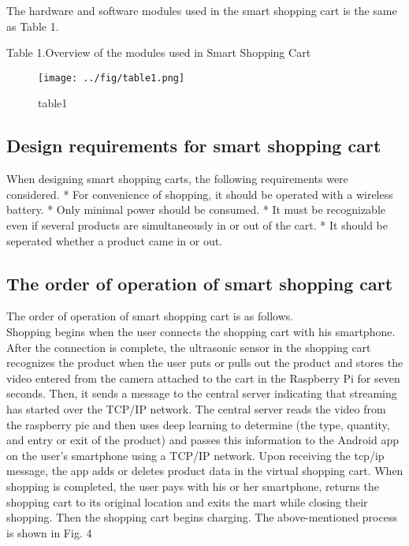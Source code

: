 \documentclass[smallextended]{svjour3}       %
\begin{document}
The hardware and software modules used in the smart shopping cart is the
same as Table 1.

Table 1.Overview of the modules used in Smart Shopping Cart

\begin{figure}
\centering
\texttt{[image: ../fig/table1.png]}
\caption{table1}
\end{figure}

\hypertarget{design-requirements-for-smart-shopping-cart}{%
\subsection{Design requirements for smart shopping
cart}\label{design-requirements-for-smart-shopping-cart}}

When designing smart shopping carts, the following requirements were
considered. * For convenience of shopping, it should be operated with a
wireless battery. * Only minimal power should be consumed. * It must be
recognizable even if several products are simultaneously in or out of
the cart. * It should be seperated whether a product came in or out.

\hypertarget{the-order-of-operation-of-smart-shopping-cart}{%
\subsection{The order of operation of smart shopping
cart}\label{the-order-of-operation-of-smart-shopping-cart}}

The order of operation of smart shopping cart is as follows.\\
Shopping begins when the user connects the shopping cart with his
smartphone. After the connection is complete, the ultrasonic sensor in
the shopping cart recognizes the product when the user puts or pulls out
the product and stores the video entered from the camera attached to the
cart in the Raspberry Pi for seven seconds. Then, it sends a message to
the central server indicating that streaming has started over the TCP/IP
network. The central server reads the video from the raspberry pie and
then uses deep learning to determine (the type, quantity, and entry or
exit of the product) and passes this information to the Android app on
the user's smartphone using a TCP/IP network. Upon receiving the tcp/ip
message, the app adds or deletes product data in the virtual shopping
cart. When shopping is completed, the user pays with his or her
smartphone, returns the shopping cart to its original location and exits
the mart while closing their shopping. Then the shopping cart begins
charging. The above-mentioned process is shown in Fig. 4
\end{document}
